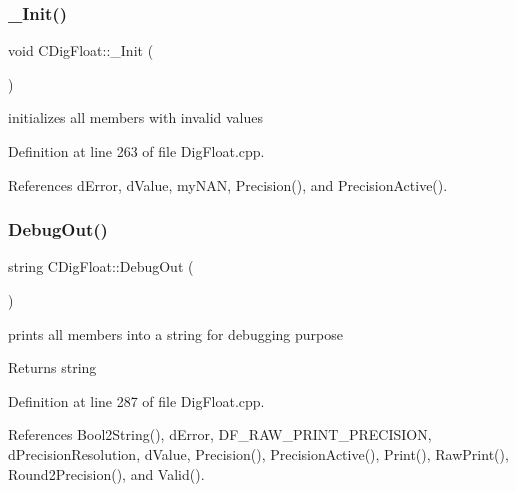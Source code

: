 \subsubsection{\texorpdfstring{\+\_\+\+Init()}{\_Init()}}
{\footnotesize\ttfamily void C\+Dig\+Float\+::\+\_\+\+Init (\begin{DoxyParamCaption}{ }\end{DoxyParamCaption})\hspace{0.3cm}{\ttfamily [protected]}}



initializes all members with invalid values 



Definition at line 263 of file Dig\+Float.\+cpp.



References d\+Error, d\+Value, my\+N\+AN, Precision(), and Precision\+Active().

\mbox{\label{classCDigFloat_a006a43f81560e2429dce9aca7742a4e7}} 
\subsubsection{\texorpdfstring{Debug\+Out()}{DebugOut()}}
{\footnotesize\ttfamily string C\+Dig\+Float\+::\+Debug\+Out (\begin{DoxyParamCaption}{ }\end{DoxyParamCaption})}



prints all members into a string for debugging purpose 

\begin{DoxyReturn}{Returns}
string 
\end{DoxyReturn}


Definition at line 287 of file Dig\+Float.\+cpp.



References Bool2\+String(), d\+Error, D\+F\+\_\+\+R\+A\+W\+\_\+\+P\+R\+I\+N\+T\+\_\+\+P\+R\+E\+C\+I\+S\+I\+ON, d\+Precision\+Resolution, d\+Value, Precision(), Precision\+Active(), Print(), Raw\+Print(), Round2\+Precision(), and Valid().

\mbox{\label{classCDigFloat_a1b067b1bde507408956fa65bef7368bb}} 
